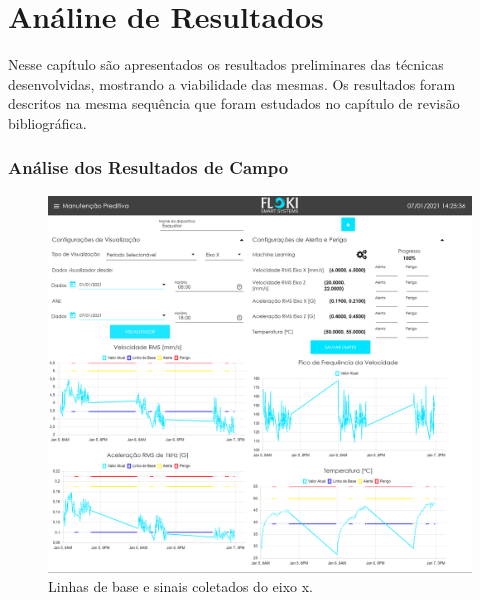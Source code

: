 
\chapter{Análine de Resultados}

Nesse capítulo são apresentados os resultados preliminares das técnicas desenvolvidas, mostrando a viabilidade das mesmas. Os resultados 
foram descritos na mesma sequência que foram estudados no capítulo de revisão bibliográfica.


% 

\subsection{Análise dos Resultados de Campo}


\begin{figure}[H]
    \caption{Linhas de base e sinais coletados do eixo x.}
    \begin{center}
        \includegraphics[scale=.15]{resultados/img/drakkar_eixo_x.png}
    \end{center}
    \label{fig:ica}
\end{figure}


